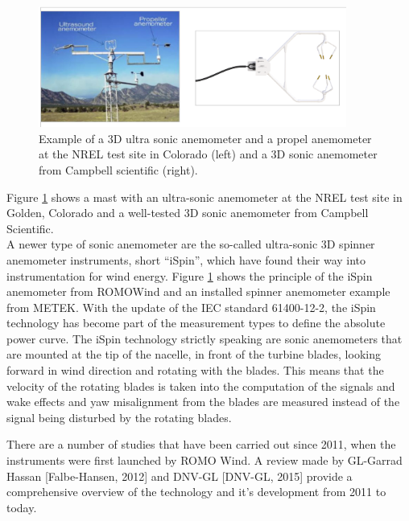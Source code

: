 \begin{figure}[h!]
\includegraphics[width=0.9\textwidth]{figures/anemometer_sonic.png}
\caption{Example of a 3D ultra sonic anemometer and a propel anemometer at the NREL test site in Colorado (left) and a 3D sonic anemometer from Campbell scientific (right).}
\label{fig:nrel_sonic_anemometers}
\end{figure}

Figure \ref{fig:nrel_sonic_anemometers} shows a mast with an ultra-sonic anemometer at the NREL test site in Golden, Colorado and a well-tested 3D sonic anemometer from Campbell Scientific.\\

A newer type of sonic anemometer are the so-called ultra-sonic 3D spinner anemometer instruments, short “iSpin”, which have found their way into instrumentation for wind energy. Figure \ref{fig:nrel_sonic_anemometers} shows the principle of the iSpin anemometer from ROMOWind and an installed spinner anemometer example from METEK. With the update of the IEC standard 61400-12-2, the iSpin technology has become part of the measurement types to define the absolute power curve. The iSpin technology strictly speaking are sonic anemometers that are mounted at the tip of the nacelle, in front of the turbine blades, looking forward in wind direction and rotating with the blades. This means that the velocity of the rotating blades is taken into the computation of the signals and wake effects and yaw misalignment from the blades are measured instead of the signal being disturbed by the rotating blades. 

There are a number of studies that have been carried out since 2011, when the instruments were first launched by ROMO Wind. A review made by GL-Garrad Hassan [Falbe-Hansen, 2012] and DNV-GL [DNV-GL, 2015] provide a comprehensive overview of the technology and it's development from 2011 to today. 

